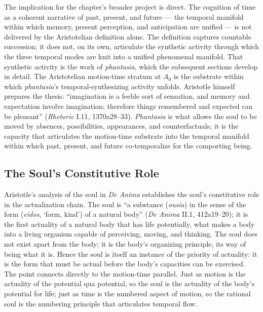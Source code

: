 The implication for the chapter's broader project is direct. The cognition of time as a coherent narrative of past, present, and future --- the temporal manifold within which memory, present perception, and anticipation are unified --- is not delivered by the Aristotelian definition alone. The definition captures countable succession; it does not, on its own, articulate the synthetic activity through which the three temporal modes are knit into a unified phenomenal manifold. That synthetic activity is the work of \textit{phantasia}, which the subsequent sections develop in detail. The Aristotelian motion-time stratum at $A_0$ is the substrate within which \textit{phantasia}'s temporal-synthesizing activity unfolds. Aristotle himself prepares the thesis: ``imagination is a feeble sort of sensation, and memory and expectation involve imagination; therefore things remembered and expected can be pleasant'' (\textit{Rhetoric} I.11, 1370a28--33). \textit{Phantasia} is what allows the soul to be moved by absences, possibilities, appearances, and counterfactuals; it is the capacity that articulates the motion-time substrate into the temporal manifold within which past, present, and future co-temporalize for the comporting being.

\subsection{The Soul's Constitutive Role}

Aristotle's analysis of the soul in \textit{De Anima} establishes the soul's constitutive role in the actualization chain. The soul is ``a substance (\textit{ousia}) in the sense of the form (\textit{eidos},  `form, kind') of a natural body'' (\textit{De Anima} II.1, 412a19--20); it is the first actuality of a natural body that has life potentially, what makes a body into a living organism capable of perceiving, moving, and thinking. The soul does not exist apart from the body; it is the body's organizing principle, its way of being what it is. Hence the soul is itself an instance of the priority of actuality: it is the form that must be actual before the body's capacities can be exercised. The point connects directly to the motion-time parallel. Just as motion is the actuality of the potential qua potential, so the soul is the actuality of the body's potential for life; just as time is the numbered aspect of motion, so the rational soul is the numbering principle that articulates temporal flow.

